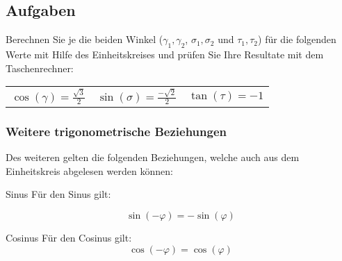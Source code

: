 





\newpage
\subsection*{Aufgaben}
Berechnen Sie je die beiden Winkel ($\gamma_1, \gamma_2$,
$\sigma_1, \sigma_2$ und $\tau_1, \tau_2$) für die folgenden Werte mit Hilfe des
Einheitskreises und prüfen Sie Ihre Resultate mit dem Taschenrechner:


\begin{tabular}{|c|c|c|}
  $\cos(\gamma)=\frac{\sqrt{3}}{2}$ & $\sin(\sigma) = \frac{-\sqrt{2}}{2}$ & $\tan(\tau) = -1$\\
\end{tabular}







\newpage


\subsubsection{Weitere trigonometrische Beziehungen}
Des weiteren gelten die folgenden Beziehungen, welche auch aus dem
Einheitskreis abgelesen werden können:
\begin{gesetz}{Sinus}{}
 Für den Sinus gilt:

  $$\sin(-\varphi) = - \sin(\varphi)$$
  \end{gesetz}

\begin{gesetz}{Cosinus}{}
 Für den Cosinus gilt:
  $$\cos(-\varphi) = \cos(\varphi)$$
  \end{gesetz}

